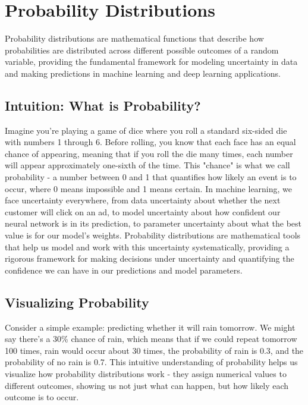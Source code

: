 
\section{Probability Distributions }
\label{sec:probability-distributions}

Probability distributions are mathematical functions that describe how probabilities are distributed across different possible outcomes of a random variable, providing the fundamental framework for modeling uncertainty in data and making predictions in machine learning and deep learning applications.

\subsection{Intuition: What is Probability?}

Imagine you're playing a game of dice where you roll a standard six-sided die with numbers 1 through 6. Before rolling, you know that each face has an equal chance of appearing, meaning that if you roll the die many times, each number will appear approximately one-sixth of the time. This "chance" is what we call probability - a number between 0 and 1 that quantifies how likely an event is to occur, where 0 means impossible and 1 means certain. In machine learning, we face uncertainty everywhere, from data uncertainty about whether the next customer will click on an ad, to model uncertainty about how confident our neural network is in its prediction, to parameter uncertainty about what the best value is for our model's weights. Probability distributions are mathematical tools that help us model and work with this uncertainty systematically, providing a rigorous framework for making decisions under uncertainty and quantifying the confidence we can have in our predictions and model parameters.

\subsection{Visualizing Probability}

Consider a simple example: predicting whether it will rain tomorrow. We might say there's a 30\% chance of rain, which means that if we could repeat tomorrow 100 times, rain would occur about 30 times, the probability of rain is 0.3, and the probability of no rain is 0.7. This intuitive understanding of probability helps us visualize how probability distributions work - they assign numerical values to different outcomes, showing us not just what can happen, but how likely each outcome is to occur.

